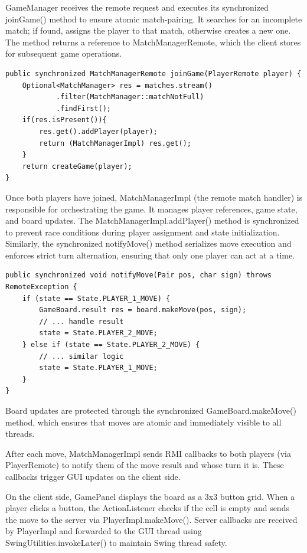 \documentclass{scrartcl}
\begin{document}
GameManager receives the remote request and executes its synchronized 
joinGame() method to ensure atomic match-pairing. It searches for an 
incomplete match; if found, assigns the player to that match, otherwise 
creates a new one. The method returns a reference to MatchManagerRemote, 
which the client stores for subsequent game operations.

\begin{verbatim}
public synchronized MatchManagerRemote joinGame(PlayerRemote player) {
    Optional<MatchManager> res = matches.stream()
            .filter(MatchManager::matchNotFull)
            .findFirst();
    if(res.isPresent()){
        res.get().addPlayer(player);
        return (MatchManagerImpl) res.get();
    }
    return createGame(player);
}
\end{verbatim}

Once both players have joined, MatchManagerImpl (the remote match handler) 
is responsible for orchestrating the game. It manages player references, 
game state, and board updates. The MatchManagerImpl.addPlayer() method is 
synchronized to prevent race conditions during player assignment and state 
initialization. Similarly, the synchronized notifyMove() method serializes 
move execution and enforces strict turn alternation, ensuring that only one 
player can act at a time.

\begin{verbatim}
public synchronized void notifyMove(Pair pos, char sign) throws RemoteException {
    if (state == State.PLAYER_1_MOVE) {
        GameBoard.result res = board.makeMove(pos, sign);
        // ... handle result
        state = State.PLAYER_2_MOVE;
    } else if (state == State.PLAYER_2_MOVE) {
        // ... similar logic
        state = State.PLAYER_1_MOVE;
    }
}
\end{verbatim}

Board updates are protected through the synchronized GameBoard.makeMove() 
method, which ensures that moves are atomic and immediately visible to all 
threads.

After each move, MatchManagerImpl sends RMI callbacks to both players 
(via PlayerRemote) to notify them of the move result and whose turn it is. 
These callbacks trigger GUI updates on the client side.

On the client side, GamePanel displays the board as a 3x3 button grid. 
When a player clicks a button, the ActionListener checks if the cell is 
empty and sends the move to the server via PlayerImpl.makeMove(). Server callbacks are received by 
PlayerImpl and forwarded to the GUI thread using SwingUtilities.invokeLater() 
to maintain Swing thread safety.
\end{document}
